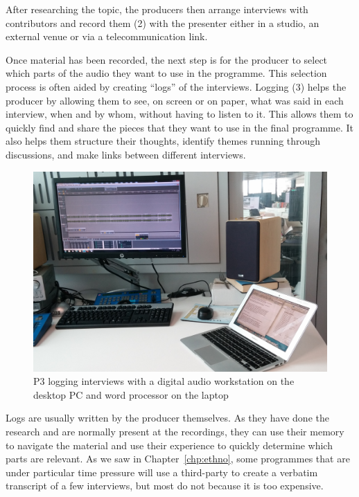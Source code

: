 After researching the topic, the producers then arrange interviews with
contributors and record them (2) with the presenter either in a studio, an external
venue or via a telecommunication link.


Once material has been recorded, the next step is for the producer to select which parts of the audio they want to use
in the programme.  This selection process is often aided by creating ``logs'' of the interviews.  Logging (3) helps the
producer by allowing them to see, on screen or on paper, what was said in each interview, when and by whom, without
having to listen to it.  This allows them to quickly find and share the pieces that they want to use in the final
programme.  It also helps them structure their thoughts, identify themes running through discussions, and make links
between different interviews.

\begin{figure}[ht]
\centering
  \includegraphics[width=\columnwidth]{figs/phil-desk.jpg}
  \caption{P3 logging interviews with a digital audio workstation on the desktop
    PC and word processor on the laptop}
  \label{fig:desk}
\end{figure}

Logs are usually written by the producer themselves. As they have done the research and are normally present at the
recordings, they can use their memory to navigate the material and use their experience to quickly determine which
parts are relevant. As we saw in Chapter~\ref{chp:ethno}, some programmes that are under particular time pressure will
use a third-party to create a verbatim transcript of a few interviews, but most do not because it is too expensive.

